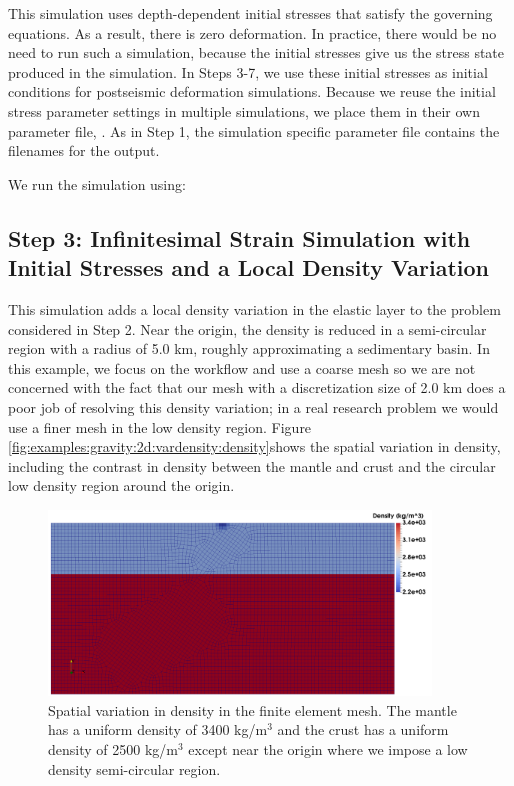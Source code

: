 This simulation uses depth-dependent initial stresses that satisfy the
governing equations. As a result, there is zero deformation. In
practice, there would be no need to run such a simulation, because the
initial stresses give us the stress state produced in the simulation.
In Steps 3-7, we use these initial stresses as initial conditions for
postseismic deformation simulations. Because we reuse the initial
stress parameter settings in multiple simulations, we place them in
their own parameter file, . As in
Step 1, the simulation specific parameter file contains the filenames
for the output.

We run the simulation using:

\subsection{Step 3: Infinitesimal Strain Simulation with Initial Stresses and
a Local Density Variation}

This simulation adds a local density variation in the elastic layer
to the problem considered in Step 2. Near the origin, the density
is reduced in a semi-circular region with a radius of 5.0 km, roughly
approximating a sedimentary basin. In this example, we focus on the
workflow and use a coarse mesh so we are not concerned with the fact
that our mesh with a discretization size of 2.0 km does a poor job
of resolving this density variation; in a real research problem we
would use a finer mesh in the low density region. Figure \vref{fig:examples:gravity:2d:vardensity:density}shows
the spatial variation in density, including the contrast in density
between the mantle and crust and the circular low density region around
the origin.

\begin{figure}
  \includegraphics[width=4in]{examples/figs/grav2d_vardensity-density}
  \caption{Spatial variation in density in the finite element mesh. The mantle
    has a uniform density of 3400 kg/m$^{3}$ and the crust has a uniform
    density of 2500 kg/m$^{3}$ except near the origin where we impose
    a low density semi-circular region.}
  \label{fig:examples:gravity:2d:vardensity:density}
\end{figure}

